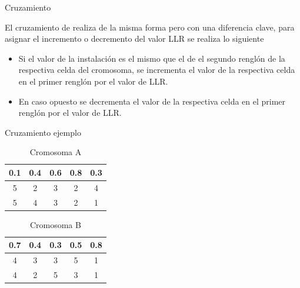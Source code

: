 \documentclass[10pt]{beamer}
\begin{document}
\begin{frame}{Cruzamiento}

	El cruzamiento de realiza de la misma forma pero con una diferencia clave,
	para asignar el incremento o decremento del valor LLR se realiza lo siguiente
	
	\begin{itemize}
	
		\item Si el valor de la instalación es el mismo que el de el segundo
		renglón de la respectiva celda del cromosoma, se incrementa el valor
		 de la respectiva celda en el primer renglón por el valor de LLR.
		
		\item En caso opuesto se decrementa el valor de la respectiva celda en el
		primer renglón por el valor de LLR.
	
	\end{itemize}

\end{frame}

\begin{frame}{Cruzamiento ejemplo}

	\begin{table}
 		\caption{Cromosoma A}
 		\begin{tabular}[t]{|c|c||c|c|c|}
			\hline
			0.1 & 0.4 & 0.6 & 0.8 & 0.3 \\
			\hline
			5 & 2 & 3 & 2 & 4\\
			\hline
			5 & 4 & 3 & 2 & 1\\
			\hline
		\end{tabular}
 	\end{table}
 	
 	\begin{table}
 		\caption{Cromosoma B}
 		\begin{tabular}[t]{|c|c||c|c|c|}
			\hline
			0.7 & 0.4 & 0.3 & 0.5 & 0.8 \\
			\hline
			4 & 3 & 3 & 5 & 1\\
			\hline
			4 & 2 & 5 & 3 & 1\\
			\hline
		\end{tabular}
 	\end{table}


\end{frame}
\end{document}
